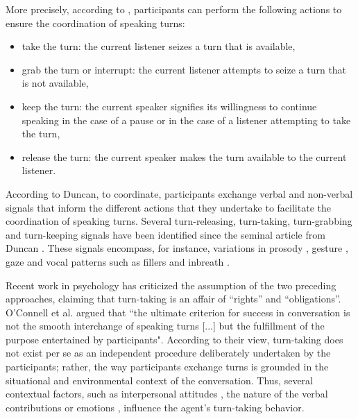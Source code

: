 \documentclass[twocolumn]{svjour3}
\begin{document}
More precisely, according to \citep{bunt_dimensions_2006}, participants can perform the following actions to ensure the coordination of speaking turns: 
\begin{itemize}
\item take the turn: the current listener seizes a turn that is available,
\item grab the turn or interrupt: the current listener attempts to seize a turn that is not available,
\item keep the turn: the current speaker signifies its willingness to continue speaking in the case of a pause or in the case of a listener attempting to take the turn,
\item release the turn: the current speaker makes the turn available to the current listener.
\end{itemize}

According to Duncan, to coordinate, participants exchange verbal and non-verbal signals that inform the different actions that they undertake to facilitate the coordination of speaking turns. 
Several turn-releasing, turn-taking, turn-grabbing and turn-keeping signals have been identified since the seminal article from Duncan \citep{duncan_signals_1972}. These signals encompass, for instance, variations in prosody \citep{duncan_signals_1972,gravano_turn-taking_2011,hjalmarsson_additive_2011}, gesture \citep{duncan_signals_1972,mondada_multimodal_2007}, gaze \citep{kendon_functions_1967,novick_coordinating_1996,oertel_gaze_2013} and vocal patterns 
such as fillers \citep{benus_pragmatic_2011} and inbreath \citep{torreira_breathing_2015}.  

Recent work in psychology has criticized the assumption of the two preceding approaches, claiming that turn-taking is an affair of ``rights'' and ``obligations''. O'Connell et al.\citep{oconnell_turn-taking_1990} argued that ``the ultimate criterion for success in conversation is not the smooth interchange of speaking turns [...] but the fulfillment of the purpose entertained by participants". According to their view, turn-taking does not exist per se as an independent procedure deliberately undertaken by the participants; rather, the way participants exchange turns is grounded in the situational and environmental context of the conversation.
Thus, several contextual factors, such as interpersonal attitudes \citep{ter_maat_how_2010}, the nature of the verbal contributions \citep{clark_using_1996,cafaro_effects_2016} or emotions \citep{goldberg_interrupting_1990}, influence the agent's turn-taking behavior. 
\end{document}
